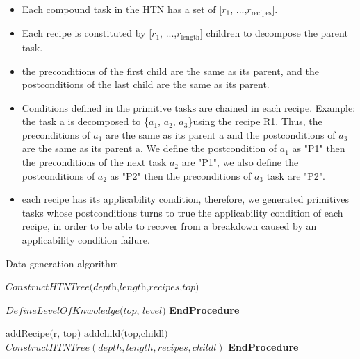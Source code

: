 \begin{itemize}
	\item Each compound task in the HTN has a set of [$r_1$, ...,$r_\text{recipes}$].
	\item Each recipe is constituted by [$r_1$, ...,$r_\text{length}$] children to decompose the parent task.
	\item the preconditions of the first child are the same as its parent, and the postconditions of the last child are the same as its parent. 
	\item Conditions defined in the primitive tasks are chained in each recipe. Example: the task a is decomposed to \{$a_1$, $a_2$, $a_3$\}using the recipe R1. Thus, the preconditions of $a_1$ are the same as its parent a and the postconditions of $a_3$ are the same as its parent a. We define the postcondition of $a_1$ as "P1" then the preconditions of the next task $a_2$ are "P1", we also define the postconditions of $a_2$ as "P2" then the preconditions of $a_3$ task are "P2".
	\item each recipe has its applicability condition, therefore, we generated primitives tasks whose postconditions turns to true the applicability condition of each recipe, in order to be able to recover from a breakdown caused by an applicability condition failure. 
\end{itemize}
\begin{algorithm}
\caption{Data generation algorithm }\label{tree}
\begin{algorithmic}[]
	\State $\textit{ConstructHTNTree(depth,length,recipes,top)} $

	\State $\textit{DefineLevelOfKnwoledge(top, level)} $
	\EndProcedure \textbf{EndProcedure}
	\State
	\State
	
\State $\text{addRecipe(r, top)}$
\State $\text{addchild(top,childl})$
\State $ConstructHTNTree(depth,length,recipes,childl)$
\EndFor
\EndFor
\EndIf
	\EndProcedure \textbf{EndProcedure}
\end{algorithmic}
\end{algorithm}
